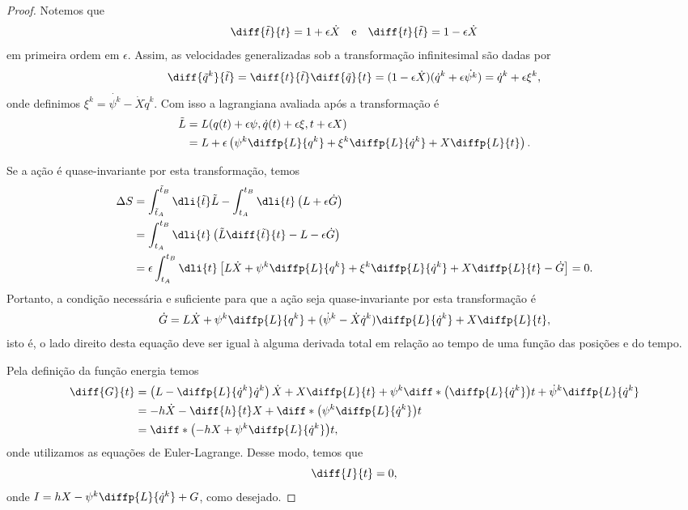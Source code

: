 \begin{proof}
    Notemos que
    \begin{equation*}
        \diff{\tilde{t}}{t} = 1 + \epsilon \dot{X}\quad{\text{e}}\quad\diff{t}{\tilde{t}} = 1 - \epsilon\dot{X}
    \end{equation*}
    em primeira ordem em \(\epsilon\). Assim, as velocidades generalizadas sob a transformação infinitesimal são dadas por
    \begin{equation*}
        \diff{\tilde{q}^k}{\tilde{t}} = \diff{t}{\tilde{t}}\diff{\tilde{q}}{t} = (1 - \epsilon \dot{X})(\dot{q}^k + \epsilon \dot{\psi^k}) = \dot{q}^k + \epsilon \xi^k,
    \end{equation*}
    onde definimos \(\xi^k = \dot{\psi^k} - \dot{X}\dot{q}^k\). Com isso a lagrangiana avaliada após a transformação é
    \begin{align*}
        \tilde{L} &= L(q(t) + \epsilon \psi, \dot{q}(t) + \epsilon\xi, t + \epsilon X)\\
                  &= L + \epsilon \left(\psi^k \diffp{L}{q^k} + \xi^k \diffp{L}{\dot{q}^k} + X\diffp{L}{t}\right).
    \end{align*}

    Se a ação é quase-invariante por esta transformação, temos
    \begin{align*}
        \Delta S &= \int_{\tilde{t}_A}^{\tilde{t}_B}\dli{\tilde{t}} \tilde{L} - \int_{t_A}^{t_B} \dli{t} \left(L + \epsilon \dot{G}\right)\\
                 &= \int_{t_A}^{t_B} \dli{t} \left(\tilde{L}\diff{\tilde{t}}{t} - L - \epsilon \dot{G}\right)\\
                 &= \epsilon\int_{t_A}^{t_B} \dli{t} \left[L\dot{X} + \psi^k \diffp{L}{q^k} + \xi^k\diffp{L}{\dot{q}^k} + X \diffp{L}{t} - \dot{G}\right] = 0.
    \end{align*}
    Portanto, a condição necessária e suficiente para que a ação seja quase-invariante por esta transformação é
    \begin{equation*}
        \dot{G} = L \dot{X} + \psi^k \diffp{L}{q^k} + (\dot{\psi}^k - \dot{X}\dot{q}^k)\diffp{L}{\dot{q}^k} + X\diffp{L}{t},
    \end{equation*}
    isto é, o lado direito desta equação deve ser igual à alguma derivada total em relação ao tempo de uma função das posições e do tempo.

    Pela definição da função energia temos
    \begin{align*}
        \diff{G}{t} &= \left(L - \diffp{L}{\dot{q}^k}\dot{q}^k\right)\dot{X} + X\diffp{L}{t} + \psi^k\diff*{\left(\diffp{L}{\dot{q}^k}\right)}{t} + \dot{\psi}^k\diffp{L}{\dot{q}^k}\\
                    &= -h \dot{X} - \diff{h}{t}X + \diff*{\left(\psi^k\diffp{L}{\dot{q}^k}\right)}{t}\\
                    &= \diff*{\left(-hX + \psi^k\diffp{L}{\dot{q}^k}\right)}{t},
    \end{align*}
    onde utilizamos as equações de Euler-Lagrange. Desse modo, temos que
    \begin{equation*}
        \diff{I}{t} = 0,
    \end{equation*}
    onde \(I = hX - \psi^k\diffp{L}{\dot{q}^k} + G\), como desejado.
\end{proof}

